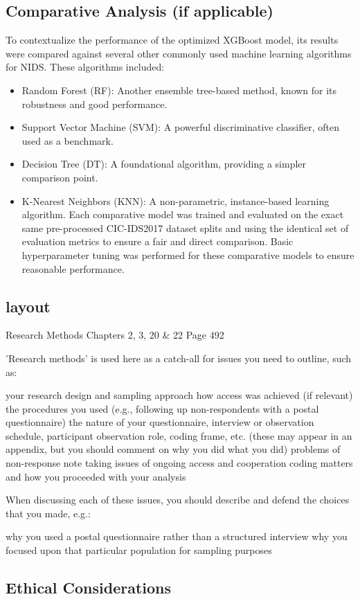 \subsection{Comparative Analysis (if applicable)}
To contextualize the performance of the optimized XGBoost model, its results were compared against several other commonly used machine learning algorithms for NIDS. These algorithms included:
\begin{itemize}
    \item Random Forest (RF): Another ensemble tree-based method, known for its robustness and good performance.
    \item Support Vector Machine (SVM): A powerful discriminative classifier, often used as a benchmark.
    \item Decision Tree (DT): A foundational algorithm, providing a simpler comparison point.
    \item K-Nearest Neighbors (KNN): A non-parametric, instance-based learning algorithm. Each comparative model was trained and evaluated on the exact same pre-processed CIC-IDS2017 dataset splits and using the identical set of evaluation metrics to ensure a fair and direct comparison. Basic hyperparameter tuning was performed for these comparative models to ensure reasonable performance.
\end{itemize}

\subsection{layout}        
Research Methods
Chapters 2, 3, 20 \& 22
Page 492

'Research methods' is used here as a catch-all for issues you need to outline, such as:

    your research design and sampling approach
    how access was achieved (if relevant)
    the procedures you used (e.g., following up non-respondents with a postal questionnaire)
    the nature of your questionnaire, interview or observation schedule, participant observation role, coding frame, etc. (these may appear in an appendix, but you should comment on why you did what you did)
    problems of non-response
    note taking
    issues of ongoing access and cooperation
    coding matters and how you proceeded with your analysis

When discussing each of these issues, you should describe and defend the choices that you made, e.g.:

    why you used a postal questionnaire rather than a structured interview
    why you focused upon that particular population for sampling purposes

\subsection{Ethical Considerations}